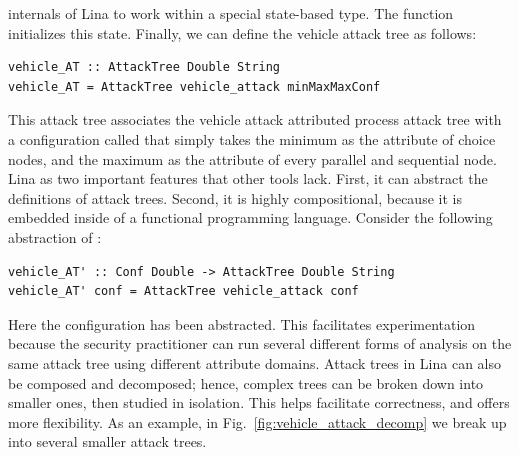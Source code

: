 \documentclass{llncs}
\begin{document}
internals of Lina to work within a special state-based type.  The
function  initializes this state.
Finally, we can define the vehicle attack tree as follows:
\begin{verbatim}
vehicle_AT :: AttackTree Double String
vehicle_AT = AttackTree vehicle_attack minMaxMaxConf
\end{verbatim}
This attack tree associates the vehicle attack attributed process
attack tree with a configuration called  that simply
takes the minimum as the attribute of choice nodes, and the maximum as
the attribute of every parallel and sequential node.
Lina as two important features that other tools lack.  First, it can
abstract the definitions of attack trees. Second, it is highly
compositional, because it is embedded inside of a functional
programming language.  Consider the following abstraction of
:
\begin{verbatim}
vehicle_AT' :: Conf Double -> AttackTree Double String
vehicle_AT' conf = AttackTree vehicle_attack conf
\end{verbatim}
Here the configuration has been abstracted.  This facilitates
experimentation because the security practitioner can run several
different forms of analysis on the same attack tree using different
attribute domains.
Attack trees in Lina can also be composed and decomposed; hence,
complex trees can be broken down into smaller ones, then studied in
isolation.  This helps facilitate correctness, and offers more
flexibility.  As an example, in Fig.~\ref{fig:vehicle_attack_decomp}
we break up  into several smaller attack trees.
\end{document}
